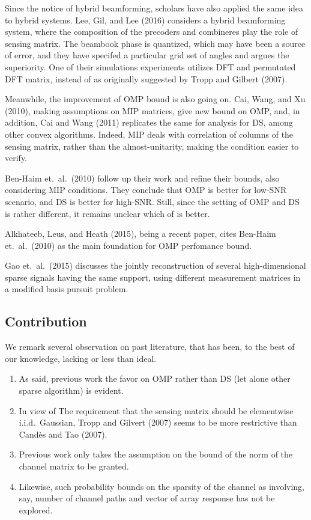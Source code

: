 Since the notice of hybrid beamforming, scholars have also applied the same idea to hybrid systems.
Lee, Gil, and Lee (2016) considers a hybrid beamforming system, where the composition of the precoders and combineres play the role of sensing matrix.
The beambook phase is quantized, which may have been a source of error, and they have specifed a particular grid set of angles and argues the superiority.
One of their simulations experiments utilizes DFT and permutated DFT matrix, instead of as originally suggested by Tropp and Gilbert (2007).

Meanwhile, the improvement of OMP bound is also going on.
Cai, Wang, and Xu (2010), making assumptions on MIP matrices, give new bound on OMP, and, in addition, Cai and Wang (2011) replicates the same for analysis for DS, among other convex algorithms.
Indeed, MIP deals with correlation of columns of the sensing matrix, rather than the almost-unitarity, making the condition easier to verify.

Ben-Haim et.\ al.\ (2010) follow up their work and refine their bounds, also considering MIP conditions.
They conclude that OMP is better for low-SNR scenario, and DS is better for high-SNR.
Still, since the setting of OMP and DS is rather different, it remains unclear which of is better.

Alkhateeb, Leus, and Heath (2015), being a recent paper, cites Ben-Haim et.\ al.\ (2010) as the main foundation for OMP perfomance bound.

Gao et.\ al.\ (2015) discusses the jointly reconstruction of several high-dimensional sparse signals having the same support, using different measurement matrices in a modified basis pursuit problem.

\subsection{Contribution}

We remark several observation on past literature, that has been, to the best of our knowledge, lacking or less than ideal.

\begin{enumerate}
\item As said, previous work the favor on OMP rather than DS (let alone other sparse algorithm) is evident.
\item In view of The requirement that the sensing matrix should be elementwise i.i.d.\ Gaussian, Tropp and Gilvert (2007) seems to be more restrictive than Cand\`es and Tao (2007).
\item Previous work only takes the assumption on the bound of the norm of the channel matrix to be granted.
\item Likewise, such probability bounds on the sparsity of the channel as involving, say, number of channel paths and vector of array response has not be explored.
\end{enumerate}

